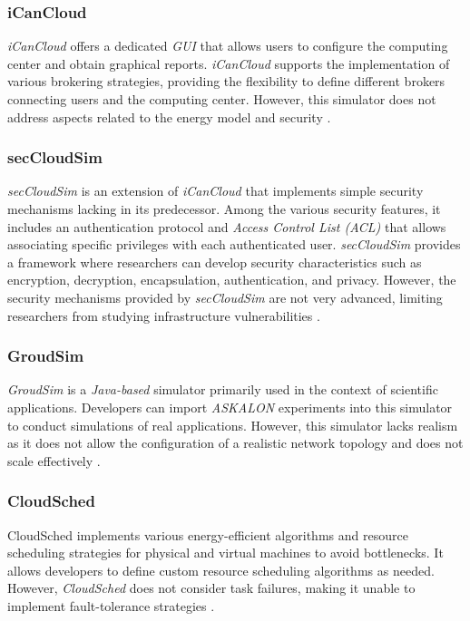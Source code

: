 {\subsubsection*{iCanCloud}
\emph{iCanCloud} \cite{nunez2012icancloud} offers a dedicated \emph{GUI} that allows users to configure the computing center and obtain graphical reports. \emph{iCanCloud} supports the implementation of various brokering strategies, providing the flexibility to define different brokers connecting users and the computing center. However, this simulator does not address aspects related to the energy model and security \cite{mansouri2020cloud}.
\subsubsection*{secCloudSim}
\emph{secCloudSim} \cite{rehman2014seccloudsim} is an extension of \emph{iCanCloud} that implements simple security mechanisms lacking in its predecessor. Among the various security features, it includes an authentication protocol and \emph{Access Control List (ACL)} that allows associating specific privileges with each authenticated user. \emph{secCloudSim} provides a framework where researchers can develop security characteristics such as encryption, decryption, encapsulation, authentication, and privacy. However, the security mechanisms provided by \emph{secCloudSim} are not very advanced, limiting researchers from studying infrastructure vulnerabilities \cite{mansouri2020cloud}.
\subsubsection*{GroudSim}
\emph{GroudSim} \cite{ostermann2011groudsim} is a \emph{Java-based} simulator primarily used in the context of scientific applications. Developers can import \emph{ASKALON} experiments \cite{fahringer2005askalon} into this simulator to conduct simulations of real applications. However, this simulator lacks realism as it does not allow the configuration of a realistic network topology and does not scale effectively \cite{mansouri2020cloud}.

\subsubsection*{CloudSched}
CloudSched \cite{tian2013toolkit} implements various energy-efficient algorithms and resource scheduling strategies for physical and virtual machines to avoid bottlenecks. It allows developers to define custom resource scheduling algorithms as needed. However, \emph{CloudSched} does not consider task failures, making it unable to implement fault-tolerance strategies \cite{mansouri2020cloud}.

}
